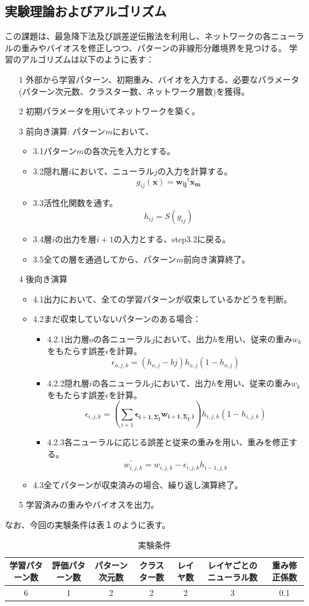 \documentclass[ %
  uplatex,%
  papersize%
]{jsarticle}
\begin{document}
\subsection{実験理論およびアルゴリズム}
この課題は、最急降下法及び誤差逆伝搬法を利用し、ネットワークの各ニューラルの重みやバイオスを修正しつつ、パターンの非線形分離境界を見つける。
学習のアルゴリズム\cite{教科書}は以下のように表す：
\begin{itemize}
\footnotesize
\item[1] 外部から学習パターン、初期重み、バイオを入力する、必要なパラメータ(パターン次元数、クラスター数、ネットワーク層数)を獲得。
\item[2] 初期パラメータを用いてネットワークを築く。
\item[3] 前向き演算: パターン$m$において、
\begin{itemize}
\footnotesize
\item3.1パターン$m$の各次元を入力とする。
\item3.2隠れ層$i$において、ニューラル$j$の入力を計算する。
	$$g_{ij}(\bm{x})=\bm{w_{ij}}^{t}\bm{x_{m}}$$
\item3.3活性化関数を通す。
	$$h_{ij}=S(g_{ij})$$
\item3.4層$i$の出力を層$i+1$の入力とする、step3.2に戻る。
\item3.5全ての層を通過してから、パターン$m$前向き演算終了。
\end{itemize}
\item[4] 後向き演算
\begin{itemize}
\item4.1出力において、全ての学習パターンが収束しているかどうを判断。
\item4.2まだ収束していないパターンのある場合：
\begin{itemize}
\item4.2.1出力層$o$の各ニューラル$j$において、出力$h$を用い、従来の重み$w_{k}$をもたらす誤差$\epsilon$を計算。
	$$\epsilon_{o,j,k}=(h_{o,j}-b{j})h_{o,j}(1-h_{o,j})$$
\item4.2.2隠れ層$i$の各ニューラル$j$において、出力$h$を用い、従来の重み$w_k$をもたらす誤差$\epsilon$を計算。
	$$\epsilon_{i,j,k}=(\sum_{i + 1}\bm{\epsilon_{i+1,\Sigma_{j} } \dot w_{i+1,\Sigma_{j}, i}})h_{i,j,k}(1-h_{i,j,k})$$
\item4.2.3各ニューラルに応じる誤差と従来の重みを用い、重みを修正する。
	$$w_{i,j,k}^{'}=w_{i,j,k}-\epsilon_{i,j,k}h_{i-1,j,k}$$
\end{itemize}
\item4.3全てパターンが収束済みの場合、繰り返し演算終了。
\end{itemize}
\item[5] 学習済みの重みやバイオスを出力。
\end{itemize}
なお、今回の実験条件は表１のように表す。
\begin{table}[h]\footnotesize
\caption{実験条件}
\label{}
\centering
\begin{tabular}{|c|c|c|c|c|c|c|}
\hline
学習パターン数&評価パターン数&パターン次元数&クラスター数&レイヤ数&レイヤごとのニューラル数&重み修正係数\\
\hline
6&1&2&2&2&3&0.1\\
\hline
\end{tabular} 
\end{table}
\end{document}

